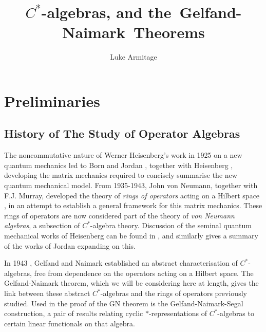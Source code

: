 \documentclass[12pt,a4paper]{report}
\author{Luke Armitage}
\title{$C^\ast$-algebras, and the~Gelfand-Naimark~Theorems}
\theoremstyle{plain}
\theoremstyle{definition}
\newcommand{\1}{\mathbbm{1}}
\begin{document}
\maketitle
\makeatletter  						%
    \providecommand\@dotsep{5}
  \makeatother
\listoftodos\relax
\newcommand\Item[1][]{ 				%
  \ifx\relax#1\relax  \item \else \item[#1] \fi
  \abovedisplayskip=0pt\abovedisplayshortskip=0pt~\vspace*{-\baselineskip}}
\tableofcontents

\chapter{Preliminaries}

\section{History of The Study of Operator Algebras}
	The noncommutative nature of Werner Heisenberg's work in 1925 on a new quantum mechanics \cite{heisenberg25} 
	led to Born and Jordan \cite{bornjordan25}, together with Heisenberg \cite{bornjordanheisenberg25}, 
	developing the matrix mechanics required to concisely summarise the new quantum mechanical model. 
	From 1935-1943, John von Neumann, together with F.J. Murray, developed the theory of \emph{rings of 
	operators} acting on a Hilbert space \cite{vonneumann35,vonneumann37,vonneumann43,vonneumann40}, in an 
	attempt to establish a general framework for this matrix mechanics.
	These rings of operators are now considered part of the theory of \emph{von Neumann algebras}, a 
	subsection of $C^\ast$-algebra theory. 
	Discussion of the seminal quantum mechanical works of Heisenberg can be found in \cite{mackinnon77}, and 
	similarly \cite{schroer03} gives a summary of the works of Jordan expanding on this.
	
	In 1943 \cite{gelfand43}, Gelfand and Naimark established an abstract characterisation of 
	$C^\ast$-algebras, free from dependence on the operators acting on a Hilbert space.
	The Gelfand-Naimark theorem, which we will be considering here at length, gives the link between these 
	abstract $C^\ast$-algebras and the rings of operators previously studied.
	Used in the proof of the GN theorem is the Gelfand-Naimark-Segal construction, a pair of results relating 
	cyclic $\ast$-representations of $C^\ast$-algebras to certain linear functionals on that algebra. 
	
\end{document}
